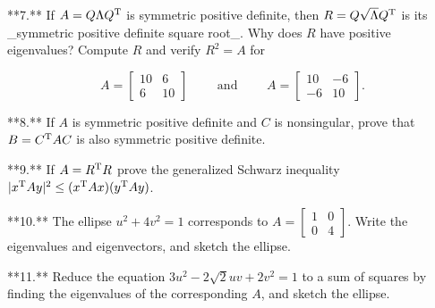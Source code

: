 **7.** If \(A=Q\Lambda Q^{\rm T}\) is symmetric positive definite, then \(R=Q\sqrt{\Lambda}Q^{\rm T}\) is its _symmetric positive definite square root_. Why does \(R\) have positive eigenvalues? Compute \(R\) and verify \(R^{2}=A\) for

\[A=\begin{bmatrix}10&6\\ 6&10\end{bmatrix}\qquad\text{ and }\qquad A=\begin{bmatrix}10&-6\\ -6&10\end{bmatrix}.\]

**8.** If \(A\) is symmetric positive definite and \(C\) is nonsingular, prove that \(B=C^{\rm T}AC\) is also symmetric positive definite.

**9.** If \(A=R^{\rm T}R\) prove the generalized Schwarz inequality \(|x^{\rm T}Ay|^{2}\leq(x^{\rm T}Ax)(y^{\rm T}Ay)\).

**10.** The ellipse \(u^{2}+4v^{2}=1\) corresponds to \(A=\begin{bmatrix}1&0\\ 0&4\end{bmatrix}\). Write the eigenvalues and eigenvectors, and sketch the ellipse.

**11.** Reduce the equation \(3u^{2}-2\sqrt{2}uv+2v^{2}=1\) to a sum of squares by finding the eigenvalues of the corresponding \(A\), and sketch the ellipse.

